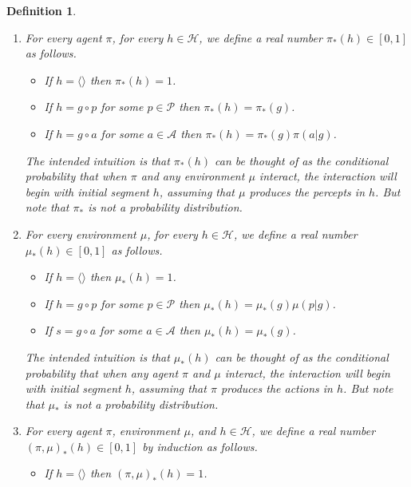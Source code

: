 \documentclass{article}
\newtheorem{definition}[theorem]{Definition}
\begin{document}
\begin{definition}
\label{pullbackdef}
    \begin{enumerate}
        \item
        For every agent $\pi$, for every $h\in\mathcal H$, we define a real number
        $\pi_*(h)\in[0,1]$ as follows.
        \begin{itemize}
            \item
            If $h=\langle\rangle$ then $\pi_*(h)=1$.
            \item
            If $h=g\circ p$ for some $p\in\mathcal P$ then $\pi_*(h)=\pi_*(g)$.
            \item
            If $h=g\circ a$ for some $a\in\mathcal A$ then $\pi_*(h)=\pi_*(g)\pi(a|g)$.
        \end{itemize}
        The intended intuition is that $\pi_*(h)$ can be thought of as the
        conditional probability that when $\pi$
        and any environment
        $\mu$ interact, the interaction will begin with initial segment
        $h$, \emph{assuming}
        that $\mu$ produces the percepts in $h$.
        But note that $\pi_*$ is \emph{not} a probability distribution.
        \item
        For every environment $\mu$, for every $h\in\mathcal H$, we define a real number
        $\mu_*(h)\in[0,1]$ as follows.
        \begin{itemize}
            \item
            If $h=\langle\rangle$ then $\mu_*(h)=1$.
            \item
            If $h=g\circ p$ for some $p\in\mathcal P$ then $\mu_*(h)=\mu_*(g)\mu(p|g)$.
            \item
            If $s=g\circ a$ for some $a\in\mathcal A$ then $\mu_*(h)=\mu_*(g)$.
        \end{itemize}
        The intended intuition is that $\mu_*(h)$ can be thought of as the
        conditional probability that when any agent $\pi$ and $\mu$ interact,
        the interaction will begin with initial segment $h$, \emph{assuming} that
        $\pi$ produces the actions in $h$.
        But note that $\mu_*$ is \emph{not} a probability distribution.
        \item
        For every agent $\pi$, environment $\mu$, and $h\in\mathcal H$, we define a
        real number $(\pi,\mu)_*(h)\in[0,1]$ by induction as follows.
        \begin{itemize}
            \item
            If $h=\langle\rangle$ then $(\pi,\mu)_*(h)=1$.

\end{itemize}
\end{enumerate}
\end{definition}
\end{document}
